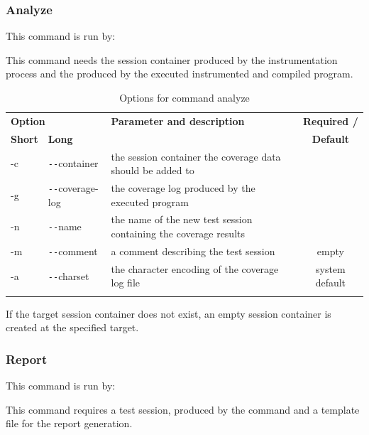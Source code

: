 \subsubsection{Analyze} \label{fr:Batch:Analyze}
This command is run by:
\begin{quote}
\end{quote}
\par
This command needs the session container produced by the instrumentation process and the  produced by the executed instrumented and compiled program.

\begin{longtable}{|l|l|p{73mm}|c|}\hline
   \multicolumn{2}{|l|}{\textbf{Option}} & 
   {\textbf{Parameter and description}} & 
   {\textbf{Required /}} \\
   {\textbf{Short}} &
   {\textbf{Long}} &
    & 
   {\textbf{Default}} \\\hline \hline \endhead
   -c & \verb$--$container & the session container the coverage data should be added to& \x \\\hline
   -g & \verb$--$coverage-log & the coverage log produced by the executed program &\x  \\\hline
   -n & \verb$--$name & the name of the new test session containing the coverage results & \x \\\hline
   -m & \verb$--$comment & a comment describing the test session & empty \\\hline
   -a & \verb$--$charset & the character encoding of the coverage log file & system default \\\hline
  \caption{Options for command analyze} 
  \label{fr_tb:Options for command analyze}
\end{longtable}
\par
If the target session container does not exist, an empty session container is created at the specified target.

\subsubsection{Report}
This command is run by:
\begin{quote}
\end{quote}
\par
This command requires a test session, produced by the command  and a template file for the report generation.

